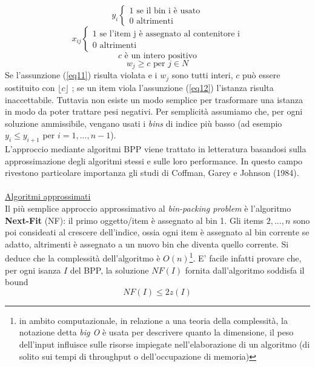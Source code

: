 \documentclass[12pt,a4paper,openright,twoside]{report}
\begin{document}
\begin{equation}\label{eq9}
y_{i}
\left\{
\begin{array}{ll}
1 \mbox{ se il bin i \`{e} usato} \\
0 \mbox{ altrimenti}
\end{array}
\right.
\end{equation}
\begin{equation}\label{eq10}
x_{ij}
\left\{
\begin{array}{ll}
1 \mbox{ se l'item j \`{e} assegnato al contenitore i} \\
0 \mbox{ altrimenti}
\end{array}
\right.
\end{equation}
$$c \mbox{ \`{e} un intero positivo}$$
\begin{equation}\label{eq11}
w_{j} \geq c \mbox{ per } j\in N
\end{equation}
Se l'assunzione (\ref{eq11}) risulta violata e i $w_{j}$ sono tutti interi, $c$ pu\`{o} essere sostituito con $\lfloor c \rfloor$ ; se un item viola l'assunzione (\ref{eq12}) l'istanza risulta inaccettabile. Tuttavia non esiste un modo semplice per trasformare una istanza in modo da poter trattare pesi negativi. Per semplicit\`{a} assumiamo che, per ogni soluzione ammissibile, vengano usati i \textit{bins} di indice pi\`{u} basso (ad esempio $y_{i} \leq y_{i+1}$ per $i = 1,...,n-1$).\\
L'approccio mediante algoritmi BPP viene trattato in letteratura basandosi sulla approssimazione degli algoritmi stessi e sulle loro performance. In questo campo rivestono particolare importanza gli studi di Coffman, Garey e Johnson (1984).\\
\\
\underline{Algoritmi approssimati}\\
Il pi\`{u} semplice approccio approssimativo al \textit{bin-packing problem} \`{e} l'algoritmo \textbf{Next-Fit} (NF): il primo oggetto/item \`{e} assegnato al bin 1. Gli items $2,...,n$ sono poi consideati al crescere dell'indice, ossia ogni item \`{e} assegnato al bin corrente se adatto, altrimenti \`{e} assegnato a un nuovo bin che diventa quello corrente. Si deduce che la complessit\`{a} dell'algoritmo \`{e} $O(n)$\footnote{in ambito computazionale, in relazione a una teoria della complessit\`{a}, la notazione detta \textit{big O} \`{e} usata per descrivere quanto la dimensione, il peso dell'input influisce sulle risorse impiegate nell'elaborazione di un algoritmo (di solito sui tempi di throughput o dell'occupazione di memoria)}. E' facile infatti provare che, per ogni isanza $I$ del BPP, la soluzione $NF(I)$ fornita dall'algoritmo soddisfa il bound $$NF(I) \leq 2 z(I)$$
\end{document}
